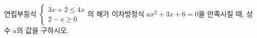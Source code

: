 연립부등식 $\begin{cases} 3x+2\le 4x \\ 2-x\ge 0 \end{cases}$의 해가 이차방정식 $ax^2+3x+6=0$을 만족시킬 때, 상수 $a$의 값을 구하시오.
